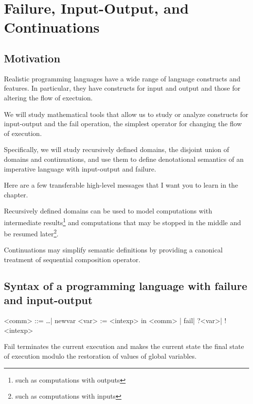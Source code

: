 \chapter{Failure, Input-Output, and Continuations}

\section{Motivation}

\begin{enumcirc}
	\item
	Realistic programming languages have a wide range of language constructs and
	features.
	In particular, they have constructs for input and output and those for altering
	the flow of exectuion.
	\item
	We will study mathematical tools that allow us to study or analyze constructs
	for input-output and the fail operation, the simplest operator for changing the
	flow of execution.
	\item
	Specifically, we will study recursively defined domains, the disjoint union of
	domains and continuations, and use them to define denotational semantics of an
	imperative language with input-output and failure.
	\item
	Here are a few transferable high-level messages that I want you to learn in the
	chapter.
	\begin{enumrm}
		\item
		Recursively defined domains can be used to model computations with intermediate
		results\footnote{such as computations with outputs}
		and computations that may be stopped in the middle and be resumed
		later\footnote{such as computations with inputs}.
		\item
		Continuations may simplify semantic definitions by providing a canonical
		treatment of sequential composition operator.
	\end{enumrm}
\end{enumcirc}

\section{Syntax of a programming language with failure and input-output}

\begin{center}
	\begin{minipage}{0.9\textwidth}
		\begin{grammar}
			<comm> ::= \dots | newvar <var> := <intexp> in <comm> | fail\footnotemark | ?<var>\footnotemark | !<intexp>\footnotemark
		\end{grammar}
	\end{minipage}
\end{center}
%
Fail terminates the current execution and makes the current state the final
state of execution modulo the restoration of values of global variables.

